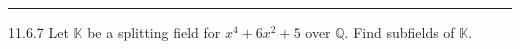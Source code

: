 \documentclass[a4paper, 12pt]{article}
\begin{document}
\noindent\rule{7in}{2.8pt}
\begin{problem}{11.6.7}
Let \(\mathbb{K}\) be a splitting field for \(x^4+6x^2+5\) over \(\mathbb{Q}\). Find subfields of \(\mathbb{K}\).
\end{problem}
\begin{solution}
    
\end{solution}
\end{document}
